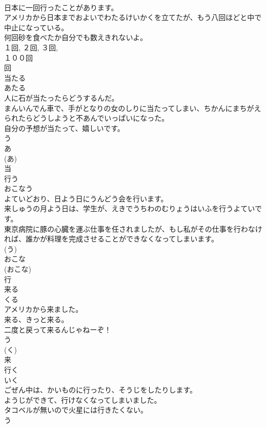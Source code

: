 \documentclass[8pt]{extreport}
\begin{document}
\begin{CJK}{UTF8}{min}
\\	日本に一回行ったことがあります。	
\\	アメリカから日本までおよいでわたるけいかくを立てたが、もう八回ほどと中で中止になっている。	
\\	何回砂を食べたか自分でも数えきれないよ。	
\\	１回, ２回, ３回, 
\\	１００回 
\\	回	
\\	当たる	
\\	あたる	
\\	人に石が当たったらどうするんだ。	
\\	まんいんでん車で、手がとなりの女のしりに当たってしまい、ちかんにまちがえられたらどうしようと不あんでいっぱいになった。	
\\	自分の予想が当たって、嬉しいです。	
\\	う 
\\	あ 
\\	(あ) 
\\	当	
\\	行う	
\\	おこなう	
\\	よていどおり、日よう日にうんどう会を行います。	
\\	来しゅうの月よう日は、学生が、えきでうちわのむりょうはいふを行うよていです。	
\\	東京病院に豚の心臓を運ぶ仕事を任されましたが、もし私がその仕事を行わなければ、誰かが料理を完成させることができなくなってしまいます。	
\\	(う) 
\\	おこな 
\\	(おこな) 
\\	行	
\\	来る	
\\	くる	
\\	アメリカから来ました。	
\\	来る、きっと来る。	
\\	二度と戻って来るんじゃねーぞ！	
\\	う 
\\	(く) 
\\	来	
\\	行く	
\\	いく	
\\	ごぜん中は、かいものに行ったり、そうじをしたりします。	
\\	ようじができて、行けなくなってしまいました。	
\\	タコベルが無いので火星には行きたくない。	
\\	う 

\end{CJK}
\end{document}

